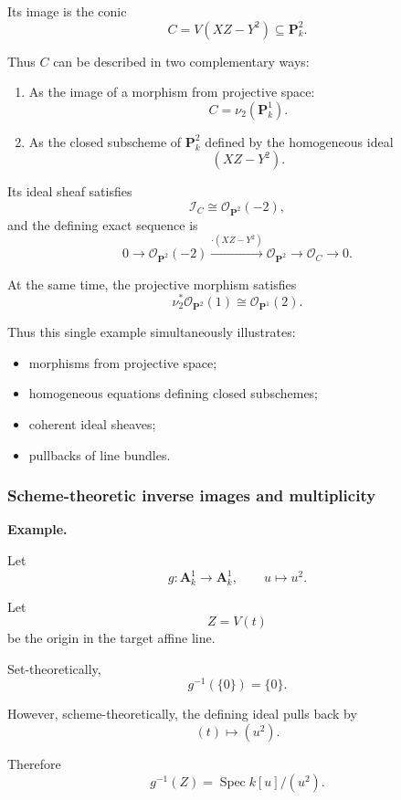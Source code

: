 Its image is the conic
\[
C=V(XZ-Y^2)\subseteq\mathbf P^2_k.
\]

Thus \(C\) can be described in two complementary ways:

\begin{enumerate}[label=\arabic*.]
	\item As the image of a morphism from projective space:
	\[
	C=\nu_2(\mathbf P^1_k).
	\]
	
	\item As the closed subscheme of \(\mathbf P^2_k\) defined by the homogeneous ideal
	\[
	(XZ-Y^2).
	\]
\end{enumerate}

Its ideal sheaf satisfies
\[
\mathcal I_C\cong\mathcal O_{\mathbf P^2}(-2),
\]
and the defining exact sequence is
\[
0
\longrightarrow
\mathcal O_{\mathbf P^2}(-2)
\xrightarrow{\cdot(XZ-Y^2)}
\mathcal O_{\mathbf P^2}
\longrightarrow
\mathcal O_C
\longrightarrow
0.
\]

At the same time, the projective morphism satisfies
\[
\nu_2^*\mathcal O_{\mathbf P^2}(1)
\cong
\mathcal O_{\mathbf P^1}(2).
\]

Thus this single example simultaneously illustrates:

\begin{itemize}
	\item morphisms from projective space;
	\item homogeneous equations defining closed subschemes;
	\item coherent ideal sheaves;
	\item pullbacks of line bundles.
\end{itemize}

\subsubsection{Scheme-theoretic inverse images and multiplicity}

\textbf{Example.}

Let
\[
g:\mathbf A^1_k\longrightarrow\mathbf A^1_k,
\qquad
u\longmapsto u^2.
\]

Let
\[
Z=V(t)
\]
be the origin in the target affine line.

Set-theoretically,
\[
g^{-1}(\{0\})=\{0\}.
\]

However, scheme-theoretically, the defining ideal pulls back by
\[
(t)\longmapsto(u^2).
\]

Therefore
\[
g^{-1}(Z)
=
\operatorname{Spec}k[u]/(u^2).
\]

